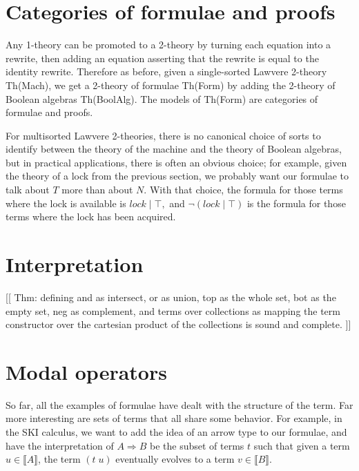 \documentclass{article}
\newcommand{\interp}[1]{\llbracket #1 \rrbracket}
\newcommand{\lhom}{\Rightarrow}
\begin{document}
\section{Categories of formulae and proofs}

Any 1-theory can be promoted to a 2-theory by turning each equation into a rewrite, then adding an equation asserting that the rewrite is equal to the identity rewrite.  Therefore as before, given a single-sorted Lawvere 2-theory Th(Mach), we get a 2-theory of formulae Th(Form) by adding the 2-theory of Boolean algebras Th(BoolAlg).  The models of Th(Form) are categories of formulae and proofs.

For multisorted Lawvere 2-theories, there is no canonical choice of sorts to identify between the theory of the machine and the theory of Boolean algebras, but in practical applications, there is often an obvious choice; for example, given the theory of a lock from the previous section, we probably want our formulae to talk about $T$ more than about $N$.  With that choice, the formula for those terms where the lock is available is $lock\;|\;\top,$ and $\neg(lock \;|\;\top)$ is the formula for those terms where the lock has been acquired.

\section{Interpretation}

[[ Thm: defining and as intersect, or as union, top as the whole set, bot as the empty set, neg as complement, and terms over collections as mapping the term constructor over the cartesian product of the collections is sound and complete. ]]

\section{Modal operators}

So far, all the examples of formulae have dealt with the structure of the term.  Far more interesting are sets of terms that all share some behavior.  For example, in the SKI calculus, we want to add the idea of an arrow type to our formulae, and have the interpretation of $A \lhom B$ be the subset of terms $t$ such that given a term $u\in\interp{A}$, the term $(t\; u)$ eventually evolves to a term $v\in\interp{B}.$
\end{document}
